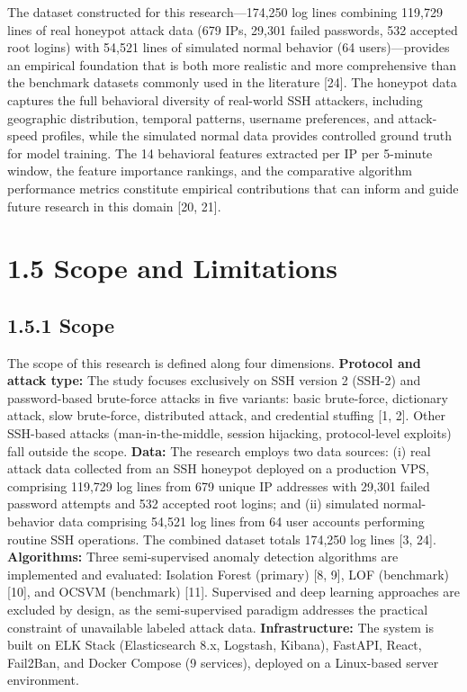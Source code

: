 \documentclass[
  a4paper]{report}
\begin{document}
The dataset constructed for this research---174,250 log lines combining
119,729 lines of real honeypot attack data (679 IPs, 29,301 failed
passwords, 532 accepted root logins) with 54,521 lines of simulated
normal behavior (64 users)---provides an empirical foundation that is
both more realistic and more comprehensive than the benchmark datasets
commonly used in the literature {[}24{]}. The honeypot data captures the
full behavioral diversity of real-world SSH attackers, including
geographic distribution, temporal patterns, username preferences, and
attack-speed profiles, while the simulated normal data provides
controlled ground truth for model training. The 14 behavioral features
extracted per IP per 5-minute window, the feature importance rankings,
and the comparative algorithm performance metrics constitute empirical
contributions that can inform and guide future research in this domain
{[}20, 21{]}.

\section{1.5 Scope and Limitations}\label{scope-and-limitations}

\subsection{1.5.1 Scope}\label{scope}

The scope of this research is defined along four dimensions.
\textbf{Protocol and attack type:} The study focuses exclusively on SSH
version 2 (SSH-2) and password-based brute-force attacks in five
variants: basic brute-force, dictionary attack, slow brute-force,
distributed attack, and credential stuffing {[}1, 2{]}. Other SSH-based
attacks (man-in-the-middle, session hijacking, protocol-level exploits)
fall outside the scope. \textbf{Data:} The research employs two data
sources: (i) real attack data collected from an SSH honeypot deployed on
a production VPS, comprising 119,729 log lines from 679 unique IP
addresses with 29,301 failed password attempts and 532 accepted root
logins; and (ii) simulated normal-behavior data comprising 54,521 log
lines from 64 user accounts performing routine SSH operations. The
combined dataset totals 174,250 log lines {[}3, 24{]}.
\textbf{Algorithms:} Three semi-supervised anomaly detection algorithms
are implemented and evaluated: Isolation Forest (primary) {[}8, 9{]},
LOF (benchmark) {[}10{]}, and OCSVM (benchmark) {[}11{]}. Supervised and
deep learning approaches are excluded by design, as the semi-supervised
paradigm addresses the practical constraint of unavailable labeled
attack data. \textbf{Infrastructure:} The system is built on ELK Stack
(Elasticsearch 8.x, Logstash, Kibana), FastAPI, React, Fail2Ban, and
Docker Compose (9 services), deployed on a Linux-based server
environment.
\end{document}
